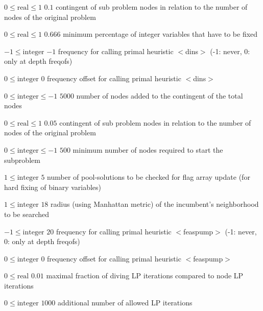 %
{$0\leq\textrm{real}\leq1$}%
{$0.1$}%
{contingent of sub problem nodes in relation to the number of nodes of the original problem}%
{}

%
{$0\leq\textrm{real}\leq1$}%
{$0.666$}%
{minimum percentage of integer variables that have to be fixed }%
{}

%
{$-1\leq\textrm{integer}$}%
{$-1$}%
{frequency for calling primal heuristic $<$dins$>$ (-1: never, 0: only at depth freqofs)}%
{}

%
{$0\leq\textrm{integer}$}%
{$0$}%
{frequency offset for calling primal heuristic $<$dins$>$}%
{}

%
{$0\leq\textrm{integer}\leq-1$}%
{$5000$}%
{number of nodes added to the contingent of the total nodes}%
{}

%
{$0\leq\textrm{real}\leq1$}%
{$0.05$}%
{contingent of sub problem nodes in relation to the number of nodes of the original problem}%
{}

%
{$0\leq\textrm{integer}\leq-1$}%
{$500$}%
{minimum number of nodes required to start the subproblem}%
{}

%
{$1\leq\textrm{integer}$}%
{$5$}%
{number of pool-solutions to be checked for flag array update (for hard fixing of binary variables)}%
{}

%
{$1\leq\textrm{integer}$}%
{$18$}%
{radius (using Manhattan metric) of the incumbent's neighborhood to be searched}%
{}

%
{$-1\leq\textrm{integer}$}%
{$20$}%
{frequency for calling primal heuristic $<$feaspump$>$ (-1: never, 0: only at depth freqofs)}%
{}

%
{$0\leq\textrm{integer}$}%
{$0$}%
{frequency offset for calling primal heuristic $<$feaspump$>$}%
{}

%
{$0\leq\textrm{real}$}%
{$0.01$}%
{maximal fraction of diving LP iterations compared to node LP iterations}%
{}

%
{$0\leq\textrm{integer}$}%
{$1000$}%
{additional number of allowed LP iterations}%
{}


